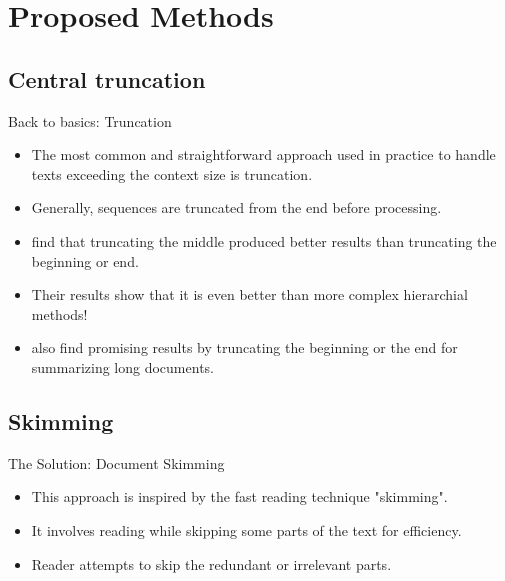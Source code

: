 \section{Proposed Methods}


\subsection{Central truncation}

\begin{frame}{Back to basics: Truncation}

\begin{itemize}
	\item The most common and straightforward approach used in practice to handle texts
	exceeding the context size is truncation.
	\item<2-> Generally, sequences are truncated from the end before processing.
	\item<3-> \citet{sun2019fine} find that truncating the middle produced better results
	than truncating the beginning or end.
	\item<4-> Their results show that it is even better than more complex hierarchial
	methods!
	\item<5> \citet{worsham-kalita-2018-genre} also find promising results by truncating
	the beginning or the end for summarizing long documents.
\end{itemize}

\end{frame}


\subsection{Skimming}

\begin{frame}{The Solution: Document Skimming}

\begin{itemize}
  \item This approach is inspired by the fast reading technique "skimming".
  \item<2-> It involves reading while skipping some parts of the text for efficiency.
  \item<3> Reader attempts to skip the redundant or irrelevant parts.
\end{itemize}



\end{frame}

